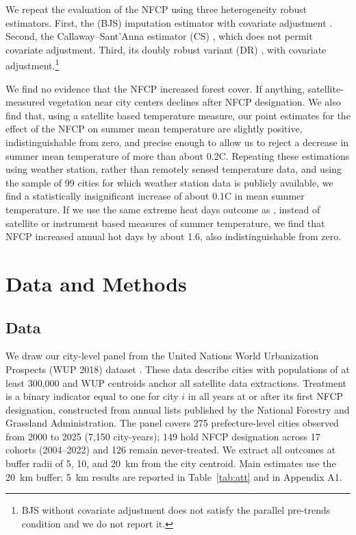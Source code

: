 \documentclass[12pt]{article}
\begin{document}
We repeat the \citet{Ma2026} evaluation of the NFCP using three heterogeneity robust estimators.  First, the \citeauthor{Borusyak2024} (BJS) imputation estimator with covariate adjustment \citep{Borusyak2024}. Second, the
Callaway--Sant'Anna estimator (CS) \citep{CS2021}, which does not permit covariate adjustment. Third, its doubly robust variant (DR) \citep{SantAnnaZhao2020}, with covariate adjustment.\footnote{BJS without covariate adjustment does not satisfy the parallel pre-trends condition and we do not report it.}

We find no evidence that the NFCP increased forest cover. If anything, satellite-measured vegetation near city centers declines after NFCP designation. We also find that, using a satellite based temperature measure, our point estimates for the effect of the NFCP on summer mean temperature are slightly positive, indistinguishable from zero, and precise enough to allow us to reject a decrease in summer mean temperature of more than about 0.2\degree C.    Repeating these estimations using weather station, rather than remotely sensed temperature data, and using the sample of 99 cities for which weather station data is publicly available, we find a statistically insignificant increase of about 0.1\degree C in mean summer temperature. If we use the same extreme heat days outcome as \citet{Ma2026}, instead of satellite or instrument based measures of summer temperature, we find that NFCP increased annual hot days by about 1.6, also indistinguishable from zero.

\section{Data and Methods}
\label{sec:data}

\subsection*{Data}

We draw our city-level panel from the
United Nations World Urbanization Prospects (WUP 2018) dataset \citep{UN2018}. These data describe cities with populations of at least 300,000 and WUP centroids anchor all satellite data extractions.  Treatment is a binary indicator equal to one for city $i$ in all years at or after its first NFCP designation, constructed from annual lists published by the National Forestry and Grassland Administration.  The panel covers 275 prefecture-level cities observed from 2000 to 2025 (7,150 city-years); 149 hold NFCP designation across 17 cohorts (2004--2022) and 126 remain never-treated. We extract all outcomes at buffer radii of 5, 10, and 20~km from the city centroid.  Main estimates use the 20~km buffer; 5~km results are reported in Table~\ref{tab:att} and in Appendix A1.
\end{document}
